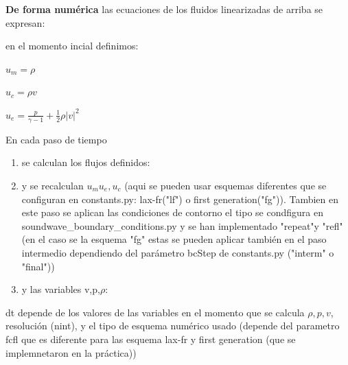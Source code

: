 \documentclass{article}
\begin{document}
\textbf{ De forma numérica} las ecuaciones de los fluidos linearizadas  de arriba se expresan: 
\begin{description}  
\item en el momento incial definimos:
\item $u_m = \rho$
\item $u_c = \rho v$
\item $u_e = \frac{p}{\gamma - 1} + \frac{1}{2}  \rho  |v|^2 $
\item En cada paso de tiempo
\begin{enumerate}  
\item se calculan los flujos definidos:
\item y se recalculan $u_m u_e, u_c$ (aqui se pueden usar esquemas diferentes que se configuran en constants.py: lax-fr("lf") o first generation("fg")). 
Tambien en este paso se aplican las condiciones de contorno el tipo se condfigura en soundwave\_boundary\_conditions.py 
y se han implementado "repeat"y "refl" (en el caso se la esquema "fg" estas se pueden aplicar también en el paso 
intermedio dependiendo del parámetro bcStep de constants.py ("interm" o "final"))


\item y las variables v,p,$\rho$:
\end{enumerate}  
\item dt depende de los valores de las variables en el momento que se calcula $\rho, p, v$, resolución (nint), y el tipo de esquema numérico usado (depende del parametro fcfl que es diferente para las esquema lax-fr y first generation (que se implemnetaron en la práctica))
 


\end{description}  
\end{document}
